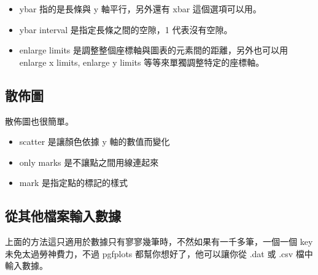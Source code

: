 \begin{itemize}
\item ybar 指的是長條與 y 軸平行，另外還有 xbar 這個選項可以用。
\item ybar interval 是指定長條之間的空隙，1 代表沒有空隙。
\item enlarge limits 是調整整個座標軸與圖表的元素間的距離，另外也可以用enlarge x limits, enlarge y limits 等等來單獨調整特定的座標軸。
\end{itemize}

\subsection{散佈圖}

散佈圖也很簡單。

\begin{tcblisting}{}
\end{tcblisting}

\begin{itemize}
\item scatter 是讓顏色依據 y 軸的數值而變化
\item only marks 是不讓點之間用線連起來
\item mark 是指定點的標記的樣式
\end{itemize}

\subsection{從其他檔案輸入數據}

上面的方法這只適用於數據只有寥寥幾筆時，不然如果有一千多筆，一個一個 key 未免太過勞神費力，不過 pgfplots 都幫你想好了，他可以讓你從 .dat 或 .csv 檔中輸入數據。

\begin{tcblisting}{}
\end{tcblisting}

